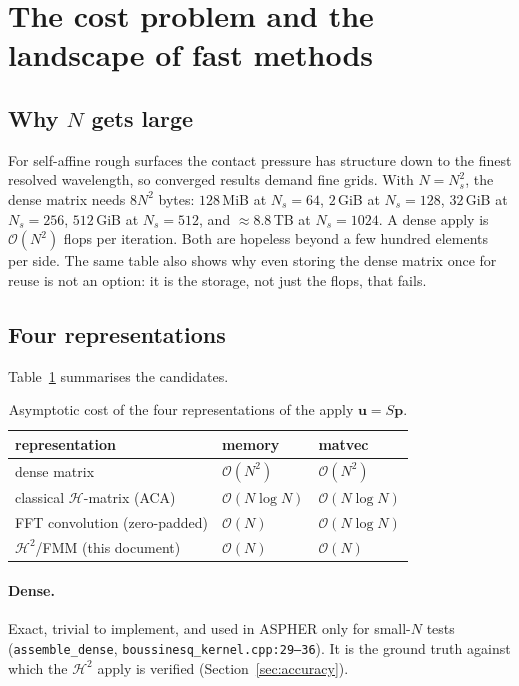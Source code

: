 \documentclass[11pt,a4paper]{article}
\newcommand{\Order}{\mathcal{O}}
\newcommand{\pp}{\mathbf{p}}
\newcommand{\Htwo}{\mathcal{H}^2}
\newcommand{\Hmat}{\mathcal{H}}
\newcommand{\code}[1]{\texttt{#1}}
\theoremstyle{definition}
\theoremstyle{remark}
\begin{document}
\section{The cost problem and the landscape of fast methods}
\label{sec:cost}

\subsection{Why $N$ gets large}

For self-affine rough surfaces the contact pressure has structure down to the
finest resolved wavelength, so converged results demand fine grids. With
$N=N_s^2$, the dense matrix needs $8N^2$ bytes: $128$\,MiB at $N_s=64$,
$2$\,GiB at $N_s=128$, $32$\,GiB at $N_s=256$, $512$\,GiB at $N_s=512$, and
$\approx 8.8$\,TB at $N_s=1024$. A dense apply is $\Order(N^2)$ flops per
iteration. Both are hopeless beyond a few hundred elements per side. The same
table also shows why even storing the dense matrix once for reuse is not an
option: it is the storage, not just the flops, that fails.

\subsection{Four representations}

Table~\ref{tab:landscape} summarises the candidates.

\begin{table}[h]
\centering
\begin{tabular}{lll}
\toprule
representation & memory & matvec \\
\midrule
dense matrix                       & $\Order(N^2)$       & $\Order(N^2)$ \\
classical $\Hmat$-matrix (ACA)     & $\Order(N\log N)$   & $\Order(N\log N)$ \\
FFT convolution (zero-padded)      & $\Order(N)$         & $\Order(N\log N)$ \\
$\Htwo$/FMM (this document)        & $\Order(N)$         & $\Order(N)$ \\
\bottomrule
\end{tabular}
\caption{Asymptotic cost of the four representations of the apply $\mathbf u=S\pp$.}
\label{tab:landscape}
\end{table}

\paragraph{Dense.} Exact, trivial to implement, and used in ASPHER only for
small-$N$ tests (\code{assemble\_dense}, \code{boussinesq\_kernel.cpp:29--36}). It
is the ground truth against which the $\Htwo$ apply is verified
(Section~\ref{sec:accuracy}).
\end{document}
